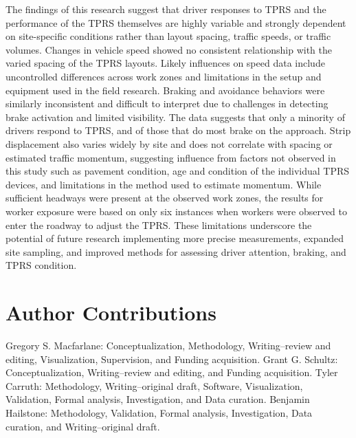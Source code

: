 \documentclass[
  letterpaper,
]{trb}
\begin{document}
The findings of this research suggest that driver responses to TPRS and
the performance of the TPRS themselves are highly variable and strongly
dependent on site-specific conditions rather than layout spacing,
traffic speeds, or traffic volumes. Changes in vehicle speed showed no
consistent relationship with the varied spacing of the TPRS layouts.
Likely influences on speed data include uncontrolled differences across
work zones and limitations in the setup and equipment used in the field
research. Braking and avoidance behaviors were similarly inconsistent
and difficult to interpret due to challenges in detecting brake
activation and limited visibility. The data suggests that only a
minority of drivers respond to TPRS, and of those that do most brake on
the approach. Strip displacement also varies widely by site and does not
correlate with spacing or estimated traffic momentum, suggesting
influence from factors not observed in this study such as pavement
condition, age and condition of the individual TPRS devices, and
limitations in the method used to estimate momentum. While sufficient
headways were present at the observed work zones, the results for worker
exposure were based on only six instances when workers were observed to
enter the roadway to adjust the TPRS. These limitations underscore the
potential of future research implementing more precise measurements,
expanded site sampling, and improved methods for assessing driver
attention, braking, and TPRS condition.


\section*{Author Contributions}\label{author-contributions}


Gregory S. Macfarlane: Conceptualization, Methodology, Writing--review
and editing, Visualization, Supervision, and Funding acquisition. Grant
G. Schultz: Conceptualization, Writing--review and editing, and Funding
acquisition. Tyler Carruth: Methodology, Writing--original draft,
Software, Visualization, Validation, Formal analysis, Investigation, and
Data curation. Benjamin Hailstone: Methodology, Validation, Formal
analysis, Investigation, Data curation, and Writing--original draft.

\end{document}
